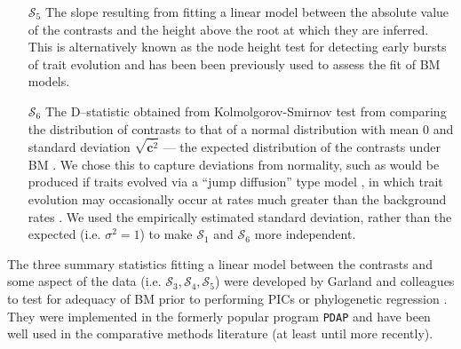 \documentclass[12pt]{article}
\begin{document}
\begin{enumerate}
\item[$\mathcal{S}_5$] The slope resulting from fitting a linear model between the absolute value of the contrasts and the height above the root at which they are inferred. This is alternatively known as the node height test \citep{FreckletonHarvey2006, SlaterPennell} for detecting early bursts of trait evolution and has been been previously used to assess the fit of BM models.

\item[$\mathcal{S}_6$] The D--statistic obtained from Kolmolgorov-Smirnov test from comparing the distribution of contrasts to that of a normal distribution with mean 0 and standard deviation $\sqrt{\overline{\mathbf{c}^2}}$ --- the expected distribution of the contrasts under BM \citep{Felsenstein1985, Rohlf2001}. We chose this to capture deviations from normality, such as would be produced if traits evolved via a ``jump diffusion'' type model \citep{Landis2013, Eastmanlevy}, in which trait evolution may occasionally occur at rates much greater than the background rates \citep[see][]{PennellPE}. We used the empirically estimated standard deviation, rather than the expected (i.e. $\sigma^2=1$) to make $\mathcal{S}_1$ and $\mathcal{S}_6$ more independent.

\end{enumerate}

The three summary statistics fitting a linear model between the contrasts and some aspect of the data (i.e. $\mathcal{S}_3, \mathcal{S}_4, \mathcal{S}_5$) were developed by Garland and colleagues \citep{Garland1992, Garland1993,  Diaz1996} to test for adequacy of BM prior to performing PICs \citep{Felsenstein1985} or phylogenetic regression \citep{Grafen1989}. They were implemented in the formerly popular program \texttt{PDAP} \citep{Garland1993, Midford2005} and have been well used in the comparative methods literature (at least until more recently).
\end{document}
